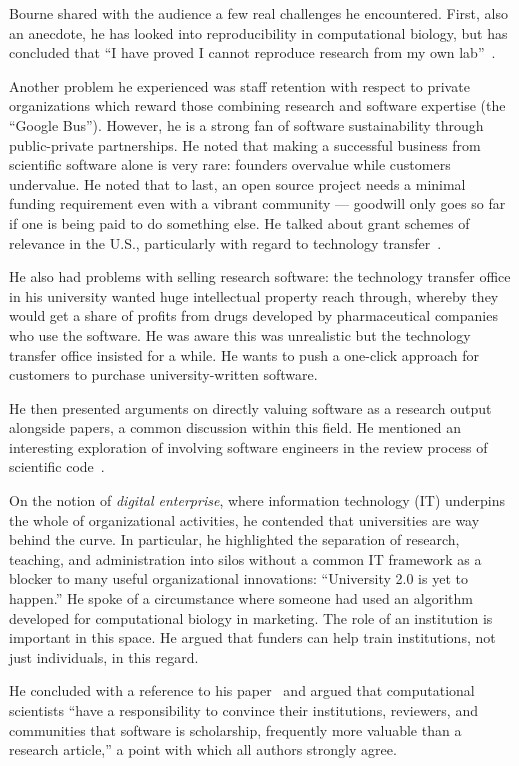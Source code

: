 \documentclass[11pt, oneside]{amsart}
\begin{document}
Bourne shared with the audience a few real challenges he
encountered. First, also an anecdote, he has looked into
reproducibility in computational biology, but has concluded that ``I
have proved I cannot reproduce research from my own
lab''~\cite{Veretnik}.

Another problem he experienced was staff retention with respect to
private organizations which reward those combining research and
software expertise (the ``Google Bus''). However, he is a strong fan
of software sustainability through public-private partnerships. He
noted that making a successful business from scientific software alone
is very rare: founders overvalue while customers undervalue. He noted
that to last, an open source project needs a minimal funding
requirement even with a vibrant community --- goodwill only goes so
far if one is being paid to do something else.  He talked about grant
schemes of relevance in the U.S., particularly with regard to
technology transfer~\cite{sbir-web, fased-web}.

He also had problems with selling research software: the technology
transfer office in his university wanted huge intellectual property
reach through, whereby they would get a share of profits from drugs
developed by pharmaceutical companies who use the software.  He was
aware this was unrealistic but the technology transfer office insisted
for a while. He wants to push a one-click approach for customers to
purchase university-written software.

He then presented arguments on directly valuing software as
a research output alongside papers, a common discussion within this field.
He mentioned an interesting exploration of involving software
engineers in the review process of scientific code~\cite{peer-review-code}.

On the notion of \emph{digital enterprise}, where information
technology (IT) underpins the whole of organizational activities, he
contended that universities are way behind the curve. In
particular, he highlighted the separation of research, teaching, and
administration into silos without a common IT framework as a blocker
to many useful organizational innovations: ``University 2.0 is yet to
happen.'' He spoke of a circumstance where someone had used an
algorithm developed for computational biology in marketing.
The role of an institution is important in this space. He argued that
funders can help train institutions, not just individuals, in this regard.

He concluded with a reference to his paper~\cite{bourne_ten} and
argued that computational scientists ``have a responsibility to
convince their institutions, reviewers, and communities that software is
scholarship, frequently
more valuable than a research article,'' a point with which all authors
strongly agree.
\end{document}
